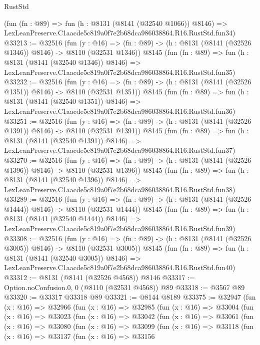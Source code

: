 \begin{lexlean}{RustStd}
\begin{coremodule}
    (fun (fn : @89) =>
    fun (h : @8131 (@8141 (@32540 @1066)) @8146) =>
    LexLeanPreserve.C1aacde5c819a0f7e2b68dca986038864.R16.RustStd.fun34)
@33213 := @32516
    (fun (y : @16) =>
    (fn : @89) -> (h : @8131 (@8141 (@32526 @1346)) @8146) -> @8110 (@32531 @1346))
    @8145
    (fun (fn : @89) =>
    fun (h : @8131 (@8141 (@32540 @1346)) @8146) =>
    LexLeanPreserve.C1aacde5c819a0f7e2b68dca986038864.R16.RustStd.fun35)
@33232 := @32516
    (fun (y : @16) =>
    (fn : @89) -> (h : @8131 (@8141 (@32526 @1351)) @8146) -> @8110 (@32531 @1351))
    @8145
    (fun (fn : @89) =>
    fun (h : @8131 (@8141 (@32540 @1351)) @8146) =>
    LexLeanPreserve.C1aacde5c819a0f7e2b68dca986038864.R16.RustStd.fun36)
@33251 := @32516
    (fun (y : @16) =>
    (fn : @89) -> (h : @8131 (@8141 (@32526 @1391)) @8146) -> @8110 (@32531 @1391))
    @8145
    (fun (fn : @89) =>
    fun (h : @8131 (@8141 (@32540 @1391)) @8146) =>
    LexLeanPreserve.C1aacde5c819a0f7e2b68dca986038864.R16.RustStd.fun37)
@33270 := @32516
    (fun (y : @16) =>
    (fn : @89) -> (h : @8131 (@8141 (@32526 @1396)) @8146) -> @8110 (@32531 @1396))
    @8145
    (fun (fn : @89) =>
    fun (h : @8131 (@8141 (@32540 @1396)) @8146) =>
    LexLeanPreserve.C1aacde5c819a0f7e2b68dca986038864.R16.RustStd.fun38)
@33289 := @32516
    (fun (y : @16) =>
    (fn : @89) -> (h : @8131 (@8141 (@32526 @1444)) @8146) -> @8110 (@32531 @1444))
    @8145
    (fun (fn : @89) =>
    fun (h : @8131 (@8141 (@32540 @1444)) @8146) =>
    LexLeanPreserve.C1aacde5c819a0f7e2b68dca986038864.R16.RustStd.fun39)
@33308 := @32516
    (fun (y : @16) =>
    (fn : @89) -> (h : @8131 (@8141 (@32526 @3005)) @8146) -> @8110 (@32531 @3005))
    @8145
    (fun (fn : @89) =>
    fun (h : @8131 (@8141 (@32540 @3005)) @8146) =>
    LexLeanPreserve.C1aacde5c819a0f7e2b68dca986038864.R16.RustStd.fun40)
@33312 := @8131 (@8141 (@32526 @4568)) @8146
@33317 := Option.noConfusion.{0, 0} (@8110 (@32531 @4568)) @89
@33318 := @3567 @89
@33320 := @33317 @33318 @89
@33321 := @8144 @8189
@33375 := @32947
    (fun (x : @16) =>
    @32966
      (fun (x : @16) =>
      @32985
        (fun (x : @16) =>
        @33004
          (fun (x : @16) =>
          @33023
            (fun (x : @16) =>
            @33042
              (fun (x : @16) =>
              @33061
                (fun (x : @16) =>
                @33080
                  (fun (x : @16) =>
                  @33099
                    (fun (x : @16) =>
                    @33118
                      (fun (x : @16) =>
                      @33137
                        (fun (x : @16) =>
                        @33156

\end{coremodule}
\end{lexlean}
